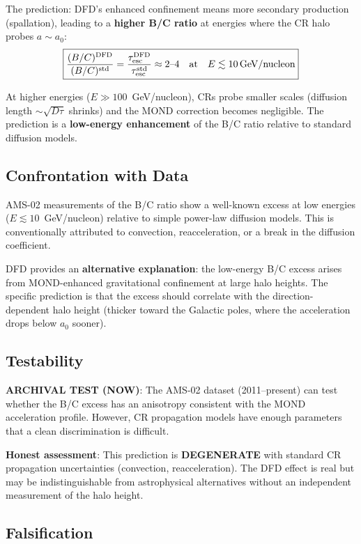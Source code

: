 \documentclass[11pt]{article}
\begin{document}
The prediction: DFD's enhanced confinement means more secondary production
(spallation), leading to a \textbf{higher B/C ratio} at energies where the
CR halo probes $a \sim a_0$:
\begin{equation}
\boxed{
\frac{(B/C)^{\rm DFD}}{(B/C)^{\rm std}} = \frac{\tau_{\rm esc}^{\rm DFD}}{\tau_{\rm esc}^{\rm std}}
\approx 2\text{--}4
\quad\text{at}\quad E \lesssim 10\,\text{GeV/nucleon}
}
\end{equation}

At higher energies ($E \gg 100$~GeV/nucleon), CRs probe smaller scales
(diffusion length $\sim \sqrt{D\tau}$ shrinks) and the MOND correction
becomes negligible. The prediction is a \textbf{low-energy enhancement}
of the B/C ratio relative to standard diffusion models.

\subsection{Confrontation with Data}

AMS-02 measurements of the B/C ratio show a well-known excess at low
energies ($E \lesssim 10$~GeV/nucleon) relative to simple power-law
diffusion models. This is conventionally attributed to convection,
reacceleration, or a break in the diffusion coefficient.

DFD provides an \textbf{alternative explanation}: the low-energy B/C
excess arises from MOND-enhanced gravitational confinement at large
halo heights. The specific prediction is that the excess should correlate
with the direction-dependent halo height (thicker toward the Galactic
poles, where the acceleration drops below $a_0$ sooner).

\subsection{Testability}

\textbf{ARCHIVAL TEST (NOW)}: The AMS-02 dataset (2011--present) can
test whether the B/C excess has an anisotropy consistent with the MOND
acceleration profile. However, CR propagation models have enough parameters
that a clean discrimination is difficult.

\textbf{Honest assessment}: This prediction is \textbf{DEGENERATE} with
standard CR propagation uncertainties (convection, reacceleration). The
DFD effect is real but may be indistinguishable from astrophysical
alternatives without an independent measurement of the halo height.

\subsection{Falsification}
\end{document}
